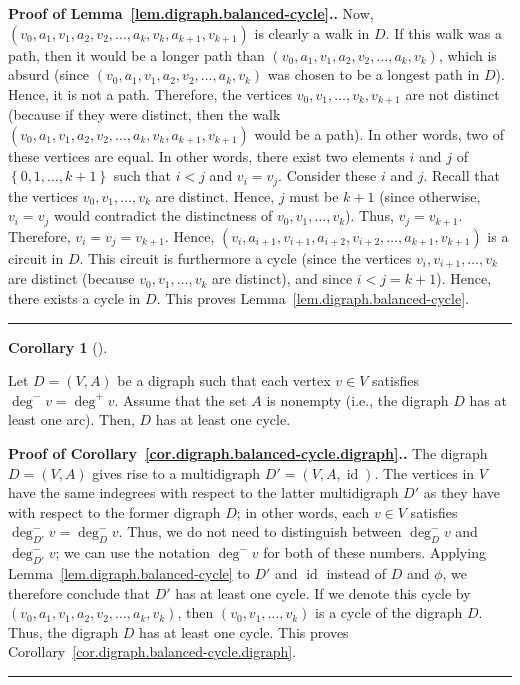 \documentclass[numbers=enddot,12pt,final,onecolumn,notitlepage]{scrartcl}%
\theoremstyle{definition}
\newtheorem{coro}[theo]{Corollary}
\newenvironment{corollary}[1][]
{\begin{coro}[#1]\begin{leftbar}}
{\end{leftbar}\end{coro}}
\newenvironment{proof}[1][Proof]{\noindent\textbf{#1.} }{\ \rule{0.5em}{0.5em}}
\newcommand{\id}{\operatorname{id}}
\newcommand{\set}[1]{\left\{ #1 \right\}}
\newcommand{\tup}[1]{\left( #1 \right)}
\begin{document}
\begin{proof}[Proof of Lemma~\ref{lem.digraph.balanced-cycle}.]
Now,
$\tup{v_0, a_1, v_1, a_2, v_2, \ldots, a_k, v_k, a_{k+1}, v_{k+1}}$ is
clearly a walk in $D$. If this walk was a path, then it would be a
longer path than $\tup{v_0, a_1, v_1, a_2, v_2, \ldots, a_k, v_k}$,
which is absurd (since
$\tup{v_0, a_1, v_1, a_2, v_2, \ldots, a_k, v_k}$
was chosen to be a longest path in $D$). Hence, it is not a path.
Therefore, the vertices $v_0, v_1, \ldots, v_k, v_{k+1}$ are not
distinct (because if they were distinct, then the walk
$\tup{v_0, a_1, v_1, a_2, v_2, \ldots, a_k, v_k, a_{k+1}, v_{k+1}}$
would be a path). In other words, two of these vertices are equal. In
other words, there exist two elements $i$ and $j$ of
$\set{0, 1, \ldots, k+1}$ such that $i < j$ and $v_i = v_j$. Consider
these $i$ and $j$.
Recall that the vertices $v_0, v_1, \ldots, v_k$ are distinct.
Hence, $j$ must be $k+1$ (since otherwise, $v_i = v_j$ would
contradict the distinctness of $v_0, v_1, \ldots, v_k$). Thus,
$v_j = v_{k+1}$. Therefore, $v_i = v_j = v_{k+1}$. Hence,
$\tup{v_i, a_{i+1}, v_{i+1}, a_{i+2}, v_{i+2}, \ldots,
      a_{k+1}, v_{k+1}}$
is a circuit in $D$. This circuit is furthermore a cycle (since the
vertices $v_i, v_{i+1}, \ldots, v_k$ are distinct (because
$v_0, v_1, \ldots, v_k$ are distinct), and since $i < j = k+1$).
Hence, there exists a cycle in $D$.
This proves Lemma~\ref{lem.digraph.balanced-cycle}.
\end{proof}

\begin{corollary} \label{cor.digraph.balanced-cycle.digraph}
Let $D = \tup{V, A}$ be a digraph such that each vertex
$v \in V$ satisfies $\deg^- v = \deg^+ v$. Assume that the set $A$ is
nonempty (i.e., the digraph $D$ has at least one arc). Then, $D$
has at least one cycle.
\end{corollary}

\begin{proof}[Proof of
Corollary~\ref{cor.digraph.balanced-cycle.digraph}.]
The digraph $D = \tup{V, A}$ gives rise to a multidigraph
$D' = \tup{V, A, \id}$. The vertices in $V$ have the same
indegrees with respect to the latter multidigraph $D'$ as they
have with respect to the former digraph $D$; in other words,
each $v \in V$ satisfies $\deg^-_{D'} v = \deg^-_D v$.
Thus, we do not need to distinguish between $\deg^-_D v$ and
$\deg^-_{D'} v$; we can use the notation $\deg^- v$ for both of
these numbers.
Applying Lemma~\ref{lem.digraph.balanced-cycle} to
$D'$ and $\id$ instead of $D$ and $\phi$, we therefore
conclude that $D'$ has at least one cycle. If we denote this
cycle by $\tup{v_0, a_1, v_1, a_2, v_2, \ldots, a_k, v_k}$,
then $\tup{v_0, v_1, \ldots, v_k}$ is a cycle of the digraph
$D$. Thus, the digraph $D$ has at least one cycle.
This proves
Corollary~\ref{cor.digraph.balanced-cycle.digraph}.
\end{proof}
\end{document}
